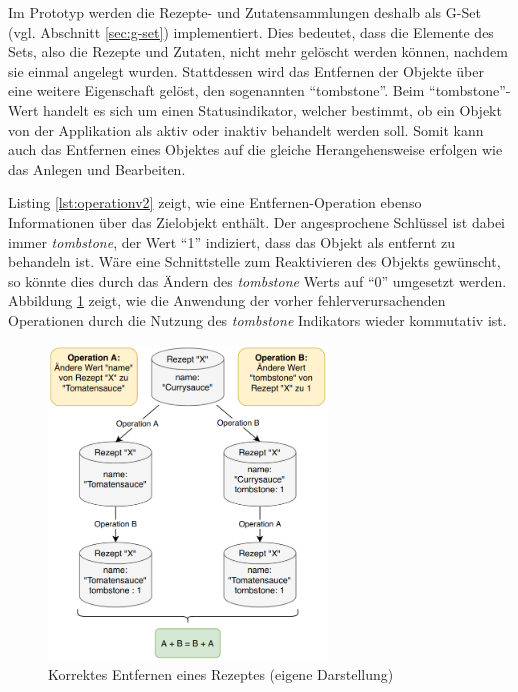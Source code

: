 \documentclass[a4paper, 12pt]{scrreprt}
\begin{document}
Im Prototyp werden die Rezepte- und Zutatensammlungen deshalb als G-Set (vgl. Abschnitt \ref{sec:g-set}) implementiert. Dies bedeutet, dass die Elemente des Sets, also die Rezepte und Zutaten, nicht mehr gelöscht werden können, nachdem sie einmal angelegt wurden. Stattdessen wird das Entfernen der Objekte über eine weitere Eigenschaft gelöst, den sogenannten \enquote{tombstone}. Beim \enquote{tombstone}-Wert handelt es sich um einen Statusindikator, welcher bestimmt, ob ein Objekt von der Applikation als aktiv oder inaktiv behandelt werden soll. Somit kann auch das Entfernen eines Objektes auf die gleiche Herangehensweise erfolgen wie das Anlegen und Bearbeiten.

\begin{minipage}{\linewidth}
	
\end{minipage}

Listing \ref{lst:operationv2} zeigt, wie eine Entfernen-Operation ebenso Informationen über das Zielobjekt enthält. Der angesprochene Schlüssel ist dabei immer \textit{tombstone}, der Wert \enquote{1} indiziert, dass das Objekt als entfernt zu behandeln ist. Wäre eine Schnittstelle zum Reaktivieren des Objekts gewünscht, so könnte dies durch das Ändern des \textit{tombstone} Werts auf \enquote{0} umgesetzt werden. Abbildung \ref{fig:rezeptLöschenGut} zeigt, wie die Anwendung der vorher fehlerverursachenden Operationen durch die Nutzung des \textit{tombstone} Indikators wieder kommutativ ist.

\begin{figure}[H]
	\centering
	\includegraphics[width=0.66\textwidth]{deleteRecipeGood.png}
	\caption[Korrektes Entfernen eines Rezeptes]{Korrektes Entfernen eines Rezeptes (eigene Darstellung)}
	\label{fig:rezeptLöschenGut}
\end{figure}
\end{document}
